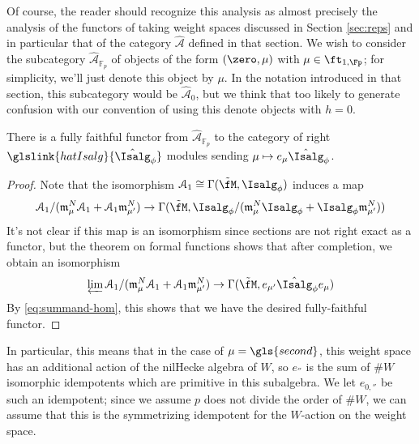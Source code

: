 Of course, the reader should recognize this analysis as almost precisely the analysis of the functors of taking weight spaces discussed in Section \ref{sec:reps} and in particular that of the category $\widehat{\mathscr{A}}$ defined in that section.  We wish to consider the subcategory $\widehat{\mathscr{A}}_{\mathbb{F}_p}$ of objects of the form $(\zero, \mu)$ with $\mu \in \ft_{1,\Fp}$; for simplicity, we'll just denote this object by $\mu$.  In the notation introduced in that section, this subcategory would be $\widehat{\mathscr{A}}_0$, but we think that too likely to generate confusion with our convention of using this denote objects with $h=0$.
\begin{lemma}\label{lem:A-H}
There is a fully faithful functor from  $\widehat{\mathscr{A}}_{\mathbb{F}_p}$ to the category of right $ \glslink{hatIsalg}{\hat{\Isalg}_\phi}$ modules sending  $\mu\mapsto e_{\mu}\hat{\Isalg}_\phi $.  
\end{lemma}
\begin{proof}
  Note that the isomorphism $\EuScript{A}_1\cong \Gamma(\tilde{\fM},{\Isalg}_\phi)$ induces a map
  \[ \EuScript{A}_1/(\mathfrak{m}_{\mu}^N
 \EuScript{A}_1+\EuScript{A}_1\mathfrak{m}_{\mu'}^N) \to \Gamma(\tilde{\fM}, {\Isalg}_\phi/(\mathfrak{m}_{\mu}^N
 {\Isalg}_\phi+{\Isalg}_\phi\mathfrak{m}_{\mu'}^N)  )\]
It's not clear if this map is an isomorphism since sections are not right exact as a functor, but the theorem on formal functions \cite[\href{https://stacks.math.columbia.edu/tag/02OC}{Theorem 02OC}]{stacks-project} shows that after completion, we obtain an isomorphism
  \[ \varprojlim
 \EuScript{A}_1/(\mathfrak{m}_{\mu}^N
 \EuScript{A}_1+\EuScript{A}_1\mathfrak{m}_{\mu'}^N)\to \Gamma(\tilde{\fM}, e_{\mu'}\hat{\Isalg}_\phi e_{\mu})\]
  By \eqref{eq:summand-hom}, this shows that we have the desired fully-faithful functor.
\end{proof}

In particular, this means that in the case of $\mu=\gls{second}$, this weight space has an additional action of the nilHecke algebra of $W$, so $e_{\second}$ is the sum of $\#W$ isomorphic idempotents which are primitive in this subalgebra. We let $e_{0,\second}$ be such an idempotent; since we assume  $p$ does not divide the order of $\# W$, we can assume that this is the symmetrizing idempotent for the $W$-action on the weight space.   


